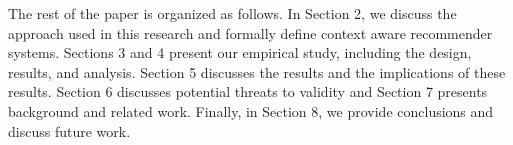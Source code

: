 The rest of the paper is organized as follows. In Section 2, 
we discuss the approach used in this research and formally 
define context aware recommender systems. 
Sections 3 and 4 present our empirical study, including the design, 
results, and analysis. Section 5 discusses the results and the 
implications of these results. Section 6 discusses potential 
threats to validity and Section 7 presents background and related work. 
Finally, in Section 8, we provide conclusions and discuss future work.







